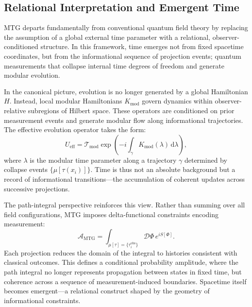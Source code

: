 \documentclass[11pt]{article}
\begin{document}
\subsection{Relational Interpretation and Emergent Time}

MTG departs fundamentally from conventional quantum field theory by replacing the assumption of a global external time parameter with a relational, observer-conditioned structure. In this framework, time emerges not from fixed spacetime coordinates, but from the informational sequence of projection events; quantum measurements that collapse internal time degrees of freedom and generate modular evolution.

In the canonical picture, evolution is no longer generated by a global Hamiltonian \( H \). Instead, local modular Hamiltonians \( K_{\mathrm{mod}} \) govern dynamics within observer-relative subregions of Hilbert space. These operators are conditioned on prior measurement events and generate modular flow along informational trajectories. The effective evolution operator takes the form:
\begin{equation}
U_{\mathrm{eff}} = \mathcal{T}_{\mathrm{mod}} \exp\left(-i \int_\gamma K_{\mathrm{mod}}(\lambda) \, \mathrm{d}\lambda \right),
\end{equation}
where \( \lambda \) is the modular time parameter along a trajectory \( \gamma \) determined by collapse events \( \{\mu[\tau(x_i)]\} \). Time is thus not an absolute background but a record of informational transitions—the accumulation of coherent updates across successive projections.

The path-integral perspective reinforces this view. Rather than summing over all field configurations, MTG imposes delta-functional constraints encoding measurement:
\begin{equation}
\mathcal{A}_{\mathrm{MTG}} = \int_{\mu[\tau] = \{\tau_i^{\mathrm{obs}}\}} \mathcal{D}\Phi \, e^{i S[\Phi]}.
\end{equation}
Each projection reduces the domain of the integral to histories consistent with classical outcomes. This defines a conditional probability amplitude, where the path integral no longer represents propagation between states in fixed time, but coherence across a sequence of measurement-induced boundaries. Spacetime itself becomes emergent—a relational construct shaped by the geometry of informational constraints.

\end{document}
